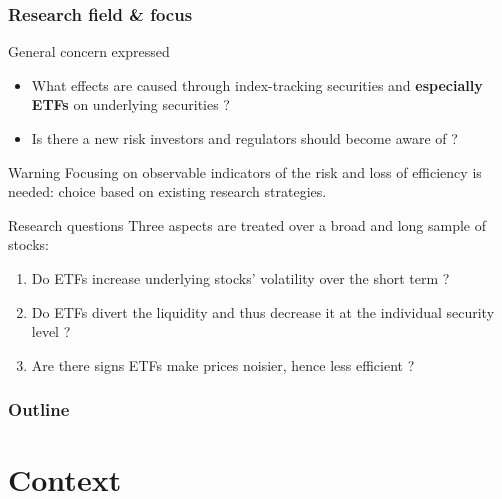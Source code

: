 \documentclass[9pt]{beamer}
\begin{document}
\begin{frame}
  \frametitle{Research field \& focus}
  \begin{block}{General concern expressed}
    \begin{itemize}
    \item What effects are caused through index-tracking securities and \textbf{especially ETFs} on underlying securities ?
    \item Is there a new risk investors and regulators should become aware of ?
    \end{itemize}
  \end{block}
  \begin{alertblock}{Warning}
    Focusing on observable indicators of the risk and loss of efficiency is needed: choice based on existing research strategies.
  \end{alertblock}
  \begin{exampleblock}{Research questions}
    Three aspects are treated over a broad and long sample of stocks:
    \begin{enumerate}
    \item Do ETFs increase underlying stocks' volatility over the short term ?
    \item Do ETFs divert the liquidity and thus decrease it at the individual security level ?
    \item Are there signs ETFs make prices noisier, hence less efficient ? 
    \end{enumerate}
  \end{exampleblock}
\end{frame}


\begin{frame}
  \frametitle{Outline}
  \tableofcontents
\end{frame}

\section{Context}
\end{document}
